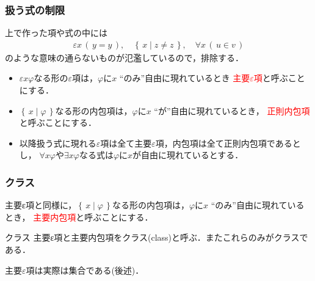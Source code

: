 \documentclass[dvipdfmx,10pt,notheorems]{beamer}
\theoremstyle{definition}
\newcommand{\Set}[2]{\left\{\, #1 \mid #2\, \right\}} %
\begin{document}
\begin{frame}\frametitle{扱う式の制限}
	上で作った項や式の中には
	\begin{align}
		\varepsilon x\, (\, y = y\, ),\quad \Set{x}{z \neq z},\quad \forall x\, (\, u \in v\, )
	\end{align}
	のような意味の通らないものが氾濫しているので，排除する．
	
	\begin{itemize}
		\item $\varepsilon x \varphi$なる形の$\varepsilon$項は，$\varphi$に$x$ ``のみ''自由に現れているとき
			\textcolor{red}{主要$\varepsilon$項}と呼ぶことにする．
			
		\item $\Set{x}{\varphi}$なる形の内包項は，$\varphi$に$x$ ``が''自由に現れているとき，
			\textcolor{red}{正則内包項}と呼ぶことにする．
			
		\item 以降扱う式に現れる$\varepsilon$項は全て主要$\varepsilon$項，内包項は全て正則内包項であるとし，
			$\forall x \varphi$や$\exists x \varphi$なる式は$\varphi$に$x$が自由に現れているとする．
	\end{itemize}
\end{frame}

\begin{frame}\frametitle{クラス}
	
	主要ε項と同様に，$\Set{x}{\varphi}$なる形の内包項は，$\varphi$に$x$ ``のみ''自由に現れているとき，
	\textcolor{red}{主要内包項}と呼ぶことにする．
			
	\begin{exampleblock}{クラス}
		主要ε項と主要内包項をクラス(class)と呼ぶ．またこれらのみがクラスである．
	\end{exampleblock}
	
	主要$\varepsilon$項は実際は集合である(後述)．
	
\end{frame}
\end{document}

